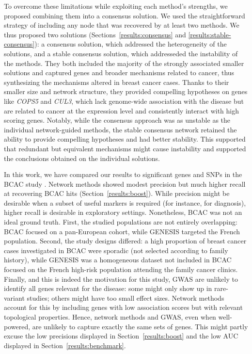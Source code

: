 \documentclass[10pt,letterpaper]{article}
\begin{document}
To overcome these limitations while exploiting each method's strengths, we proposed combining them into a consensus solution. We used the straightforward strategy of including any node that was recovered by at least two methods. We thus proposed two solutions (Sections~\ref{results:consensus} and \ref{results:stable-consensus}): a consensus solution, which addressed the heterogeneity of the solutions, and a stable consensus solution, which addresseded the instability of the methods. They both included the majority of the strongly associated smaller solutions and captured genes and broader mechanisms related to cancer, thus synthesizing the mechanisms altered in breast cancer cases. Thanks to their smaller size and network structure, they provided compelling hypotheses on genes like \emph{COPS5} and \emph{CUL3}, which lack genome-wide association with the disease but are related to cancer at the expression level and consistently interact with high scoring genes. Notably, while the consensus approach was as unstable as the individual network-guided methods, the stable consensus network retained the ability to provide compelling hypotheses and had better stability. This supported that redundant but equivalent mechanisms might cause instability and supported the conclusions obtained on the individual solutions.

In this work, we have compared our results to significant genes and SNPs in the BCAC study \cite{Michailidou2017}. Network methods showed modest precision but much higher recall at recovering BCAC hits (Section~\ref{results:boost}). While precision might be desirable when a subset of useful markers is required (for instance, for diagnosis), higher recall is desirable in exploratory settings. Nonetheless, BCAC was not an ideal ground truth. First, the studied populations are not entirely overlapping: BCAC focused on a pan-European cohort, while GENESIS targeted the French population. Second, the study designs differed: a high proportion of breast cancer cases investigated in BCAC were sporadic (not selected according to family history), while GENESIS was a homogeneous dataset not included in BCAC focused on the French high-risk population attending the family cancer clinics. Finally, and this is indeed the motivation for this study, GWAS are unlikely to identify all genes relevant for the disease: some might only show up in rare-variant studies; others might have too small effect sizes. Network methods account for this by including genes with low association scores but with relevant topological properties. Hence, network methods and GWAS, even when well-powered, are unlikely to capture exactly the same sets of genes. This might partly excuse the low precisions displayed in Section~\ref{results:boost} and the low AUC displayed in Section~\ref{results:benchmark}.
\end{document}
